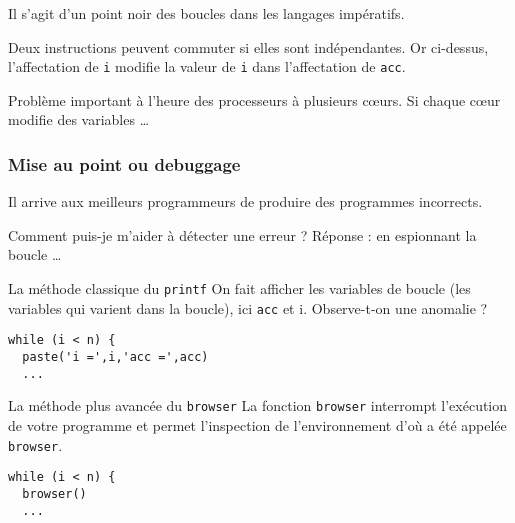 \documentclass[10pt]{beamer}
\begin{document}
\begin{frame}[fragile]
Il s'agit d'un point noir des boucles dans les langages impératifs.

\begin{alertblock}{Deux instructions peuvent commuter si elles sont indépendantes.}
Or ci-dessus, l'affectation de \texttt{i} modifie la valeur de \texttt{i} dans l'affectation de \texttt{acc}.
\end{alertblock}


\begin{block}{Problème important à l'heure des processeurs à plusieurs c{\oe}urs.}
 Si chaque c{\oe}ur modifie des variables \dots
\end{block}

\end{frame}


\begin{frame}[fragile]
  \frametitle{Mise au point ou debuggage}
  Il arrive aux meilleurs programmeurs de produire des programmes incorrects.
  \begin{alertblock}{Comment puis-je m'aider à détecter une erreur ?}
    Réponse : en espionnant la boucle \dots
  \end{alertblock}

  \begin{block}{La méthode classique du \texttt{printf}}
    On fait afficher les variables de boucle (les variables qui varient dans la boucle), ici \texttt{acc} et {i}. \alert{Observe-t-on une anomalie ?}   
  \begin{lstlisting}
while (i < n) {
  paste('i =',i,'acc =',acc)
  ...
\end{lstlisting}

\end{block}

    \begin{block}{La méthode plus avancée du \texttt{browser}}
      La fonction \texttt{browser} interrompt l'exécution de votre programme et permet l'inspection de l'environnement d'où a été appelée \texttt{browser}.
  \begin{lstlisting}
while (i < n) {
  browser()
  ...
\end{lstlisting}
\end{block}
\end{frame}
\end{document}
